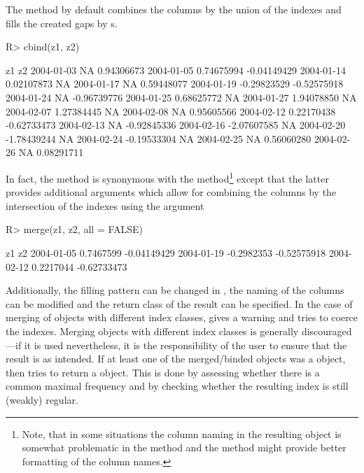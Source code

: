 \documentclass{Z}
\begin{document}
The  method by default combines the columns by the union of
the indexes and fills the created gaps by s.
\begin{Schunk}
\begin{Sinput}
R> cbind(z1, z2)
\end{Sinput}
\begin{Soutput}
                    z1          z2
2004-01-03          NA  0.94306673
2004-01-05  0.74675994 -0.04149429
2004-01-14  0.02107873          NA
2004-01-17          NA  0.59448077
2004-01-19 -0.29823529 -0.52575918
2004-01-24          NA -0.96739776
2004-01-25  0.68625772          NA
2004-01-27  1.94078850          NA
2004-02-07  1.27384445          NA
2004-02-08          NA  0.95605566
2004-02-12  0.22170438 -0.62733473
2004-02-13          NA -0.92845336
2004-02-16 -2.07607585          NA
2004-02-20 -1.78439244          NA
2004-02-24 -0.19533304          NA
2004-02-25          NA  0.56060280
2004-02-26          NA  0.08291711
\end{Soutput}
\end{Schunk}
In fact, the  method is synonymous with the 
method\footnote{Note, that in some situations the column naming in the
resulting object is somewhat problematic in the  method
and the  method might provide better formatting of the
column names.}
except that the latter provides additional arguments
which allow for combining the columns by the intersection
of the indexes using the argument 
\begin{Schunk}
\begin{Sinput}
R> merge(z1, z2, all = FALSE)
\end{Sinput}
\begin{Soutput}
                   z1          z2
2004-01-05  0.7467599 -0.04149429
2004-01-19 -0.2982353 -0.52575918
2004-02-12  0.2217044 -0.62733473
\end{Soutput}
\end{Schunk}
Additionally, the filling pattern can be changed in ,
the naming of the
columns can be modified and the return class of the result can
be specified. In the case of merging of objects with 
different index classes,  gives a warning and tries to
coerce the indexes. Merging objects with different index classes is
generally discouraged---if it is used nevertheless, it is the
responsibility of the user to ensure that the result is as intended.
If at least one of the merged/binded objects was a  
object, then  tries to return a 
object. This is done by assessing whether there is a common maximal 
frequency and by checking whether the resulting index is still
(weakly) regular.
\end{document}
